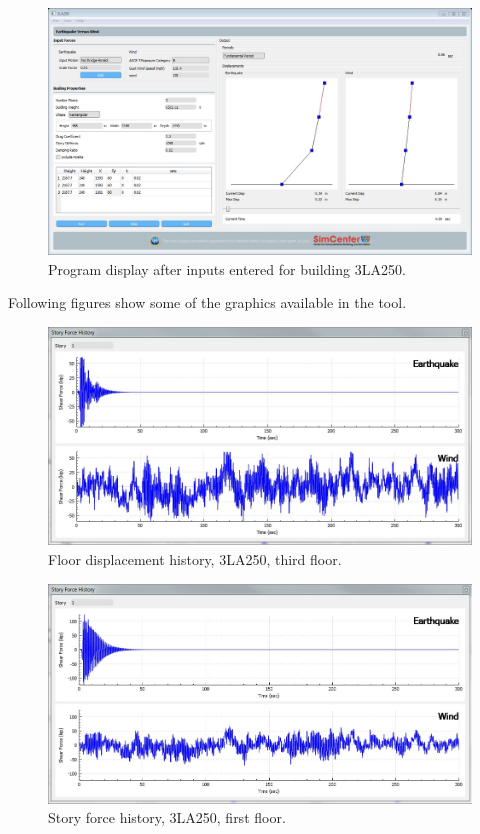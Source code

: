 \documentclass{simcenterdocumentation}
\begin{document}
\begin{figure}[H]
	\centering \includegraphics[width=0.9\linewidth]{3LA250_1.jpg}
	\caption{Program display after inputs entered for building 3LA250.}
\end{figure}
Following figures show some of the graphics available in the tool.
\begin{figure}[H]
	\centering \includegraphics[scale=0.35]{3LA250_fdh.JPG}
	\caption{Floor displacement history, 3LA250, third floor.}
\end{figure}
\begin{figure}[H]
	\centering \includegraphics[scale=0.35]{3LA250_sfh.JPG}
	\caption{Story force history, 3LA250, first floor.}
\end{figure}
\end{document}
